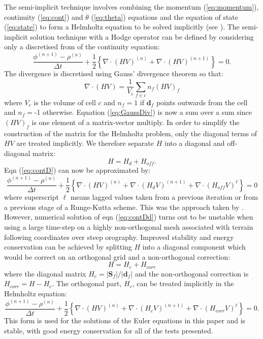 The semi-implicit technique involves combining the momentum (\ref{eq:momentum}),
continuity (\ref{eq:cont}) and $\theta$ (\ref{eq:theta}) equations
and the equation of state (\ref{eq:state}) to form a Helmholtz equation
to be solved implicitly (see \citet{weller-shahrokhi2014}). The semi-implicit
solution technique with a Hodge operator can be defined by considering
only a discretised from of the continuity equation:
\begin{equation}
\frac{\phi^{(n+1)}-\rho^{(n)}}{\Delta t}+\frac{1}{2}\left\{ \nabla\cdot(HV)^{(n)}+\nabla\cdot(HV)^{(n+1)}\right\} =0.\label{eq:contD}
\end{equation}
The divergence is discretised using Gauss' divergence theorem so that:
\begin{equation}
\nabla\cdot\left(HV\right)=\frac{1}{V_{c}}\sum_{f\in c}n_{f}(HV)_{f}\label{eq:GaussDiv}
\end{equation}
where $V_{c}$ is the volume of cell $c$ and $n_{f}=1$ if $\mathbf{d}_{f}$
points outwards from the cell and $n_{f}=$-1 otherwise. Equation
(\ref{eq:GaussDiv}) is now a sum over a sum since $(HV)_{f}$ is
one element of a matrix-vector multiply. In order to simplify the
construction of the matrix for the Helmholtz problem, only the diagonal
terms of $HV$ are treated implicitly. We therefore separate $H$
into a diagonal and off-diagonal matrix:
\begin{equation}
H=H_{d}+H_{off}.
\end{equation}
Eqn (\ref{eq:contD}) can now be approximated by:
\begin{equation}
\frac{\phi^{(n+1)}-\rho^{(n)}}{\Delta t}+\frac{1}{2}\left\{ \nabla\cdot(HV)^{(n)}+\nabla\cdot(H_{d}V)^{(n+1)}+\nabla\cdot(H_{off}V)^{\ell}\right\} =0\label{eq:contDd}
\end{equation}
where superscript $\ell$ means lagged values taken from a previous
iteration or from a previous stage of a Runge-Kutta scheme. This was
the approach taken by \citet{weller-shahrokhi2014}. However, numerical
solution of eqn (\ref{eq:contDd}) turns out to be unstable when using
a large time-step on a highly non-orthogonal mesh associated with
terrain following coordinates over steep orography. Improved stability
and energy conservation can be achieved by splitting $H$ into a diagonal
component which would be correct on an orthogonal grid and a non-orthogonal
correction:
\begin{equation}
H=H_{c}+H_{corr}
\end{equation}
where the diagonal matrix $H_{c}=|\mathbf{S}_{f}|/|\mathbf{d}_{f}|$
and the non-orthogonal correction is $H_{corr}=H-H_{c}$. The orthogonal
part, $H_{c}$, can be treated implicitly in the Helmholtz equation:
\begin{equation}
\frac{\phi^{(n+1)}-\rho^{(n)}}{\Delta t}+\frac{1}{2}\left\{ \nabla\cdot(HV)^{(n)}+\nabla\cdot(H_{c}V)^{(n+1)}+\nabla\cdot(H_{corr}V)^{\ell}\right\} =0.\label{eq:contDc}
\end{equation}
This form is used for the solutions of the Euler equations in this
paper and is stable, with good energy conservation for all of the
tests presented. 

